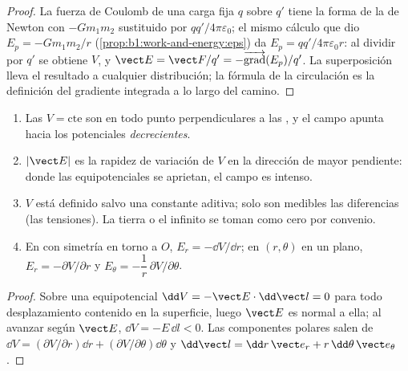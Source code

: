 \begin{proof}
La fuerza de Coulomb de una carga fija $q$ sobre $q'$ tiene la forma de
la  de Newton con $-Gm_1m_2$ sustituido por $qq'/4\pi\varepsilon_0$;
el mismo cálculo que dio $E_p = -Gm_1m_2/r$
(\cref{prop:b1:work-and-energy:eps}) da $E_p = qq'/4\pi\varepsilon_0r$: al
dividir por $q'$ se obtiene $V$, y $\vect E = \vect F/q' =
-\overrightarrow{\operatorname{grad}}(E_p)/q'$. La superposición lleva el
resultado a cualquier distribución; la fórmula de la circulación es la
definición del gradiente integrada a lo largo del camino.
\end{proof}

\begin{proposition}\label{prop:b1:potential-capacitors:reading}
\begin{enumerate}
  \item Las \emph{} $V = \text{cte}$ son en
        todo punto perpendiculares a las , y el campo
        apunta hacia los potenciales \emph{decrecientes}.
  \item $|\vect E|$ es la rapidez de variación de $V$ en la dirección de
        mayor pendiente: donde las equipotenciales se aprietan, el campo
        es intenso.
  \item $V$ está definido salvo una constante aditiva; solo son medibles
        las diferencias (las tensiones). La tierra o el infinito se toman
        como cero por convenio.
  \item En  con simetría en torno a $O$, $E_r = -\dd V/
        \dd r$; en  $(r, \theta)$ en un plano,
        $E_r = -\partial V/\partial r$ y $E_\theta = -\dfrac1r\,\partial V/\partial\theta$.
\end{enumerate}
\end{proposition}

\begin{proof}
Sobre una equipotencial $\dd V = -\vect E\cdot\dd\vect l = 0$ para todo
desplazamiento contenido en la superficie, luego $\vect E$ es normal a
ella; al avanzar según $\vect E$, $\dd V = -E\,\dd l < 0$. Las componentes
polares salen de
$\dd V = (\partial V/\partial r)\dd r + (\partial V/\partial\theta)\dd\theta$ y
$\dd\vect l = \dd r\,\vect e_r + r\,\dd\theta\,\vect e_\theta$.
\end{proof}

